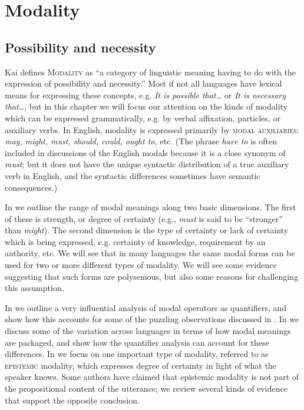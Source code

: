 \chapter{Modality}\label{sec:16}

\section{Possibility and necessity}\label{sec:16.1}

Kai \citet[20]{vonFintel2006} defines \textsc{Modality} as “a category of linguistic meaning having to do with the expression of possibility and necessity.” Most if not all languages have lexical means for expressing these concepts, e.g. \textit{It is possible that…} or \textit{It is necessary} \textit{that…}, but in this chapter we will focus our attention on the kinds of modality which can be expressed grammatically, e.g. by verbal affixation, particles, or auxiliary verbs. In English, modality is expressed primarily by \textsc{modal auxiliaries}: \textit{may, might, must, should, could, ought to,} etc. (The phrase \textit{have to} is often included in discussions of the English modals because it is a close synonym of \textit{must}; but it does not have the unique syntactic distribution of a true auxiliary verb in English, and the syntactic differences sometimes have semantic consequences.)



In  we outline the range of modal meanings along two basic dimensions. The first of these is strength, or degree of certainty (e.g., \textit{must} is said to be “stronger” than \textit{might}). The second dimension is the type of certainty or lack of certainty which is being expressed, e.g. certainty of knowledge, requirement by an authority, etc. We will see that in many languages the same modal forms can be used for two or more different types of modality. We will see some evidence suggesting that such forms are polysemous, but also some reasons for challenging this assumption.



In  we outline a very influential analysis of modal operators as quantifiers, and show how this accounts for some of the puzzling observations discussed in . In  we discuss some of the variation across languages in terms of how modal meanings are packaged, and show how the quantifier analysis can account for these differences. In  we focus on one important type of modality, referred to as \textsc{epistemic} modality, which expresses degree of certainty in light of what the speaker knows. Some authors have claimed that epistemic modality is not part of the propositional content of the utterance; we review several kinds of evidence that support the opposite conclusion.


